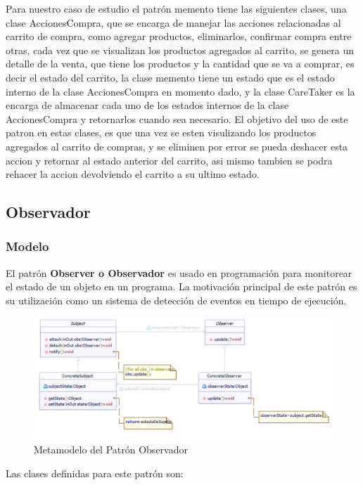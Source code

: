 Para nuestro caso de estudio el patrón memento tiene las siguientes clases, una clase AccionesCompra, que se encarga de manejar las acciones relacionadas al carrito de compra, como agregar productos, eliminarlos, confirmar compra entre otras, cada vez que se visualizan los productos agregados al carrito, se genera un detalle de la venta, que tiene los productos y la cantidad que se va a comprar, es decir el estado del carrito, la clase memento tiene un estado que es el estado interno de la clase AccionesCompra en momento dado, y la clase CareTaker es la encarga de almacenar cada uno de los estados internos de la clase AccionesCompra y retornarlos cuando sea necesario.\newline
El objetivo del uso de este patron en estas clases, es que una vez se esten visulizando los productos agregados al carrito de compras, y se eliminen por error se pueda deshacer esta accion y retornar al estado anterior del carrito, asi mismo tambien se podra rehacer la accion devolviendo el carrito a su ultimo estado.

\subsection{Observador}
\subsubsection{Modelo}

El patrón \textbf{Observer o Observador} es usado en programación para monitorear el estado de un objeto en un programa. La motivación principal de este patrón es su utilización como un sistema de detección de eventos en tiempo de ejecución.

\begin{figure}[th!]
	\centering
	\includegraphics[width=0.8\linewidth]{arquitectura/imagenes/modeloObservador}
	\caption{Metamodelo del Patrón Observador}
	\label{fig:metamodelo patron observador}
\end{figure}

Las clases definidas para este patrón son:

